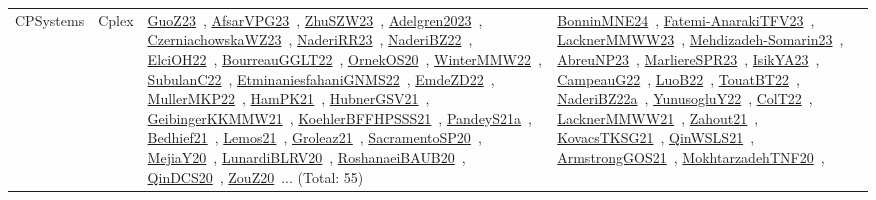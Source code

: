 {\begin{longtable}{lp{3cm}>{\raggedright\arraybackslash}p{6cm}>{\raggedright\arraybackslash}p{6cm}>{\raggedright\arraybackslash}p{8cm}}
CPSystems & Cplex & \href{../works/GuoZ23.pdf}{GuoZ23}~\cite{GuoZ23}, \href{../works/AfsarVPG23.pdf}{AfsarVPG23}~\cite{AfsarVPG23}, \href{../works/ZhuSZW23.pdf}{ZhuSZW23}~\cite{ZhuSZW23}, \href{../works/Adelgren2023.pdf}{Adelgren2023}~\cite{Adelgren2023}, \href{../works/CzerniachowskaWZ23.pdf}{CzerniachowskaWZ23}~\cite{CzerniachowskaWZ23}, \href{../works/NaderiRR23.pdf}{NaderiRR23}~\cite{NaderiRR23}, \href{../works/NaderiBZ22.pdf}{NaderiBZ22}~\cite{NaderiBZ22}, \href{../works/ElciOH22.pdf}{ElciOH22}~\cite{ElciOH22}, \href{../works/BourreauGGLT22.pdf}{BourreauGGLT22}~\cite{BourreauGGLT22}, \href{../works/OrnekOS20.pdf}{OrnekOS20}~\cite{OrnekOS20}, \href{../works/WinterMMW22.pdf}{WinterMMW22}~\cite{WinterMMW22}, \href{../works/SubulanC22.pdf}{SubulanC22}~\cite{SubulanC22}, \href{../works/EtminaniesfahaniGNMS22.pdf}{EtminaniesfahaniGNMS22}~\cite{EtminaniesfahaniGNMS22}, \href{../works/EmdeZD22.pdf}{EmdeZD22}~\cite{EmdeZD22}, \href{../works/MullerMKP22.pdf}{MullerMKP22}~\cite{MullerMKP22}, \href{../works/HamPK21.pdf}{HamPK21}~\cite{HamPK21}, \href{../works/HubnerGSV21.pdf}{HubnerGSV21}~\cite{HubnerGSV21}, \href{../works/GeibingerKKMMW21.pdf}{GeibingerKKMMW21}~\cite{GeibingerKKMMW21}, \href{../works/KoehlerBFFHPSSS21.pdf}{KoehlerBFFHPSSS21}~\cite{KoehlerBFFHPSSS21}, \href{../works/PandeyS21a.pdf}{PandeyS21a}~\cite{PandeyS21a}, \href{../works/Bedhief21.pdf}{Bedhief21}~\cite{Bedhief21}, \href{../works/Lemos21.pdf}{Lemos21}~\cite{Lemos21}, \href{../works/Groleaz21.pdf}{Groleaz21}~\cite{Groleaz21}, \href{../works/SacramentoSP20.pdf}{SacramentoSP20}~\cite{SacramentoSP20}, \href{../works/MejiaY20.pdf}{MejiaY20}~\cite{MejiaY20}, \href{../works/LunardiBLRV20.pdf}{LunardiBLRV20}~\cite{LunardiBLRV20}, \href{../works/RoshanaeiBAUB20.pdf}{RoshanaeiBAUB20}~\cite{RoshanaeiBAUB20}, \href{../works/QinDCS20.pdf}{QinDCS20}~\cite{QinDCS20}, \href{../works/ZouZ20.pdf}{ZouZ20}~\cite{ZouZ20}... (Total: 55) & \href{../works/BonninMNE24.pdf}{BonninMNE24}~\cite{BonninMNE24}, \href{../works/Fatemi-AnarakiTFV23.pdf}{Fatemi-AnarakiTFV23}~\cite{Fatemi-AnarakiTFV23}, \href{../works/LacknerMMWW23.pdf}{LacknerMMWW23}~\cite{LacknerMMWW23}, \href{../works/Mehdizadeh-Somarin23.pdf}{Mehdizadeh-Somarin23}~\cite{Mehdizadeh-Somarin23}, \href{../works/AbreuNP23.pdf}{AbreuNP23}~\cite{AbreuNP23}, \href{../works/MarliereSPR23.pdf}{MarliereSPR23}~\cite{MarliereSPR23}, \href{../works/IsikYA23.pdf}{IsikYA23}~\cite{IsikYA23}, \href{../works/CampeauG22.pdf}{CampeauG22}~\cite{CampeauG22}, \href{../works/LuoB22.pdf}{LuoB22}~\cite{LuoB22}, \href{../works/TouatBT22.pdf}{TouatBT22}~\cite{TouatBT22}, \href{../works/NaderiBZ22a.pdf}{NaderiBZ22a}~\cite{NaderiBZ22a}, \href{../works/YunusogluY22.pdf}{YunusogluY22}~\cite{YunusogluY22}, \href{../works/ColT22.pdf}{ColT22}~\cite{ColT22}, \href{../works/LacknerMMWW21.pdf}{LacknerMMWW21}~\cite{LacknerMMWW21}, \href{../works/Zahout21.pdf}{Zahout21}~\cite{Zahout21}, \href{../works/KovacsTKSG21.pdf}{KovacsTKSG21}~\cite{KovacsTKSG21}, \href{../works/QinWSLS21.pdf}{QinWSLS21}~\cite{QinWSLS21}, \href{../works/ArmstrongGOS21.pdf}{ArmstrongGOS21}~\cite{ArmstrongGOS21}, \href{../works/MokhtarzadehTNF20.pdf}{MokhtarzadehTNF20}~\cite{MokhtarzadehTNF20}, 
\end{longtable}}

